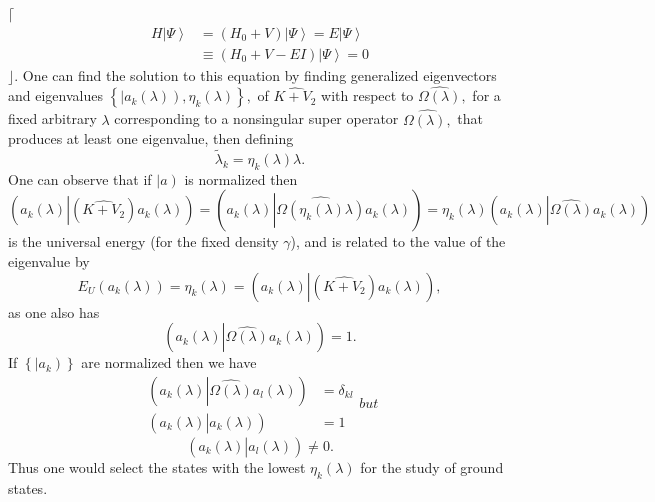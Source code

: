 \documentclass[aps,preprint]{revtex4}%
\begin{document}
$\lceil$%
\begin{align}
H\left\vert \Psi\right\rangle  &  =\left(  H_{0}+V\right)  \left\vert
\Psi\right\rangle =E\left\vert \Psi\right\rangle \nonumber\\
&  \equiv\left(  H_{0}+V-EI\right)  \left\vert \Psi\right\rangle =0
\end{align}
$\rfloor$. One can find the solution to this equation by finding generalized
eigenvectors and eigenvalues $\left\{  \left\vert a_{k}\left(  \lambda\right)
\right)  ,\eta_{k}\left(  \lambda\right)  \right\}  ,$ of $\widehat{K+V_{2}}$
with respect to $\widehat{\Omega\left(  \lambda\right)  },$ for a fixed
arbitrary $\lambda$ corresponding to a nonsingular super operator
$\widehat{\Omega\left(  \lambda\right)  ,}$ that produces at least one
eigenvalue, then defining
\begin{equation}
\tilde{\lambda}_{k}=\eta_{k}\left(  \lambda\right)  \lambda.
\end{equation}
One can observe that if $\left\vert a\right)  $ is normalized then
\begin{equation}
\left(  a_{k}\left(  \lambda\right)  \left\vert \left(  \widehat{K+V_{2}%
}\right)  \right.  a_{k}\left(  \lambda\right)  \right)  =\left(  a_{k}\left(
\lambda\right)  \left\vert \widehat{\Omega\left(  \eta_{k}\left(
\lambda\right)  \lambda\right)  }\right.  a_{k}\left(  \lambda\right)
\right)  =\eta_{k}\left(  \lambda\right)  \left(  a_{k}\left(  \lambda\right)
\left\vert \widehat{\Omega\left(  \lambda\right)  }\right.  a_{k}\left(
\lambda\right)  \right)
\end{equation}
is the universal energy (for the fixed density $\gamma$), and is related to
the value of the eigenvalue by
\begin{equation}
E_{U}\left(  a_{k}\left(  \lambda\right)  \right)  =\eta_{k}\left(
\lambda\right)  =\left(  a_{k}\left(  \lambda\right)  \left\vert \left(
\widehat{K+V_{2}}\right)  \right.  a_{k}\left(  \lambda\right)  \right)  ,
\end{equation}
as one also has
\begin{equation}
\left(  a_{k}\left(  \lambda\right)  \left\vert \widehat{\Omega\left(
\lambda\right)  }\right.  a_{k}\left(  \lambda\right)  \right)  =1.
\end{equation}
If $\left\{  \left\vert \overset{}{a_{k}}\right)  \right\}  $ are normalized
then we have
\begin{subequations}
\begin{align}
\left(  a_{k}\left(  \lambda\right)  \left\vert \widehat{\Omega\left(
\lambda\right)  }\right.  a_{l}\left(  \lambda\right)  \right)   &
=\delta_{kl}\\
\left(  a_{k}\left(  \lambda\right)  \left\vert \overset{}{a_{k}\left(
\lambda\right)  }\right.  \right)   &  =1
\end{align}
but
\end{subequations}
\begin{equation}
\left(  a_{k}\left(  \lambda\right)  \left\vert \overset{}{a_{l}\left(
\lambda\right)  }\right.  \right)  \neq0.
\end{equation}
Thus one would select the states with the lowest $\eta_{k}\left(
\lambda\right)  $ for the study of ground states.
\end{document}
